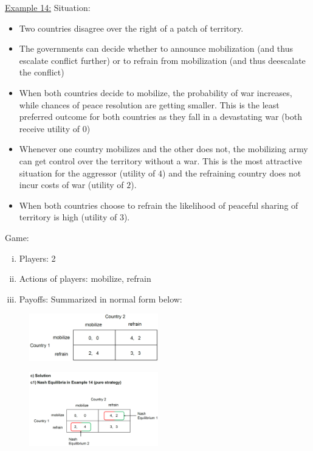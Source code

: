 \underline{Example 14:}
Situation:
\begin{itemize}
    \item Two countries disagree over the right of a patch of territory.
    \item The governments can decide whether to announce mobilization (and thus
        escalate conflict further) or to refrain from mobilization (and thus
        deescalate the conflict)
    \item When both countries decide to mobilize, the probability of war increases,
        while chances of peace resolution are getting smaller. This is the least
        preferred outcome for both countries as they fall in a devastating war
        (both receive utility of $0$)
    \item Whenever one country mobilizes and the other does not, the mobilizing
        army can get control over the territory without a war. This is the most
        attractive situation for the aggressor (utility of $4$) and the
        refraining country does not incur costs of war (utility of $2$).
    \item When both countries choose to refrain the likelihood of peaceful
        sharing of territory is high (utility of $3$).
\end{itemize}
Game:
\begin{enumerate}[(i)]
    \item Players: 2
    \item Actions of players: mobilize, refrain
    \item Payoffs: Summarized in normal form below:
\end{enumerate}

\begin{figure}[H]
    \centering
    \includegraphics[width=0.5\textwidth]{Pictures/chicken_game.png}
\end{figure}

\begin{figure}[H]
    \centering
    \includegraphics[width=0.5\textwidth]{Pictures/chicken_solution.png}
\end{figure}

